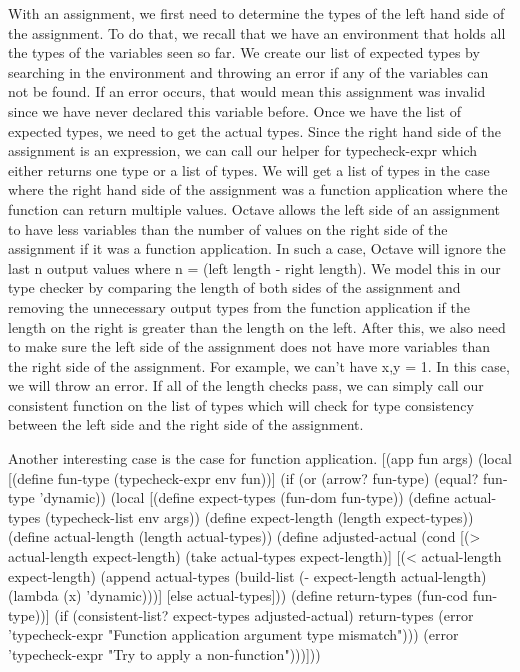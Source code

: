 With an assignment, we first need to determine the types of the left hand side of the assignment. To do that, we recall that we have an environment that holds all the types of the variables seen so far. We create our list of expected types by searching in the environment and throwing an error if any of the variables can not be found. If an error occurs, that would mean this assignment was invalid since we have never declared this variable before. Once we have the list of expected types, we need to get the actual types. Since the right hand side of the assignment is an expression, we can call our helper for typecheck-expr which either returns one type or a list of types. We will get a list of types in the case where the right hand side of the assignment was a function application where the function can return multiple values. Octave allows the left side of an assignment to have less variables than the number of values on the right side of the assignment if it was a function application. In such a case, Octave will ignore the last n output values where n = (left length - right length). We model this in our type checker by comparing the length of both sides of the assignment and removing the unnecessary output types from the function application if the length on the right is greater than the length on the left. After this, we also need to make sure the left side of the assignment does not have more variables than the right side of the assignment. For example, we can’t have x,y = 1. In this case, we will throw an error. If all of the length checks pass, we can simply call our consistent function on the list of types which will check for type consistency between the left side and the right side of the assignment.  

Another interesting case is the case for function application.
    [(app fun args)
     (local [(define fun-type (typecheck-expr env fun))]
       (if (or (arrow? fun-type) (equal? fun-type 'dynamic))
           (local [(define expect-types (fun-dom fun-type))
                   (define actual-types (typecheck-list env args))
                   (define expect-length (length expect-types))
                   (define actual-length (length actual-types))
                   (define adjusted-actual
                     (cond
                       [(> actual-length expect-length)
                        (take actual-types expect-length)]
                       [(< actual-length expect-length)
                        (append actual-types
                                (build-list (- expect-length actual-length)
                                            (lambda (x) 'dynamic)))]
                       [else actual-types]))
                   (define return-types (fun-cod fun-type))]
             (if (consistent-list? expect-types adjusted-actual)
                 return-types
                 (error 'typecheck-expr "Function application argument type mismatch")))
           (error 'typecheck-expr "Try to apply a non-function")))]))

